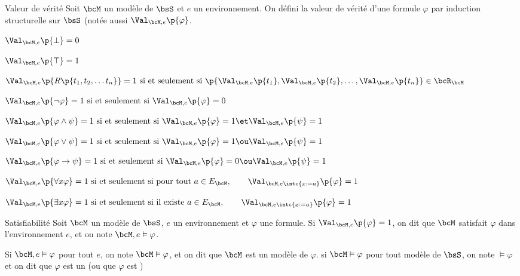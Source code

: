     \begin{definition}{Valeur de vérité}{}
        Soit $\bcM$ un modèle de $\bsS$ et $e$ un environnement. On défini la valeur de vérité d'une formule $\varphi$ par induction structurelle sur $\bsS$ (notée aussi $\Val_{\bcM, e}\p{\varphi}$.
        
        \begin{enumerate}
            \itast $\Val_{\bcM, e}\p{\bot} = 0$
            
            \itast $\Val_{\bcM, e}\p{\top} = 1$
            
            \itast $\Val_{\bcM, e}\p{R\p{t_1,t_2, \dots t_n}} = 1 \ \text{si et seulement si} \ \p{\Val_{\bcM, e}\p{t_1},\Val_{\bcM, e}\p{t_2},\dots,\Val_{\bcM, e}\p{t_n}} \in \bcR_\bcM$
            
            \itast $\Val_{\bcM, e}\p{\neg \varphi} = 1 \ \text{si et seulement si} \ \Val_{\bcM, e}\p{\varphi} = 0$
            
            \itast $\Val_{\bcM, e}\p{\varphi \land \psi} = 1 \ \text{si et seulement si} \ \Val_{\bcM, e}\p{\varphi} = 1 \et \Val_{\bcM, e}\p{\psi} = 1$
            
            \itast $\Val_{\bcM, e}\p{\varphi \lor \psi} = 1 \ \text{si et seulement si} \ \Val_{\bcM, e}\p{\varphi} = 1 \ou \Val_{\bcM, e}\p{\psi} = 1$
            
            \itast $\Val_{\bcM, e}\p{\varphi \to \psi} = 1 \ \text{si et seulement si} \ \Val_{\bcM, e}\p{\varphi} = 0 \ou \Val_{\bcM, e}\p{\psi} = 1$
            
            \itast $\Val_{\bcM, e}\p{\forall x \varphi} = 1 \ \text{si et seulement si} \ \text{pour tout} \ a \in E_\bcM,\qquad \Val_{\bcM, e\intc{x := a}}\p{\varphi} = 1$
            
            \itast $\Val_{\bcM, e}\p{\exists x \varphi} = 1 \ \text{si et seulement si} \ \text{il existe} \ a \in E_\bcM,\qquad \Val_{\bcM, e\intc{x := a}}\p{\varphi} = 1$
            
            
        \end{enumerate}
    \end{definition}
    
    \begin{definition}{Satisfiabilité}{}
        Soit $\bcM$ un modèle de $\bsS$, $e$ un environnement et $\varphi$ une formule.
        Si $\Val_{\bcM, e}\p{\varphi} = 1$, on dit que $\bcM$ satisfait $\varphi$ dans l'environnement $e$, et on note $\bcM, e \vDash \varphi$.
        \begin{enumerate}
            \itast Si $\bcM, e \vDash \varphi$ pour tout $e$, on note $\bcM \vDash \varphi$, et on dit que $\bcM$ est un modèle de $\varphi$.
            \itast si $\bcM \vDash \varphi$ pour tout modèle de $\bsS$, on note $\vDash \varphi$ et on dit que $\varphi$ est un  (ou que $\varphi$ est )
        \end{enumerate}
    \end{definition}
    
